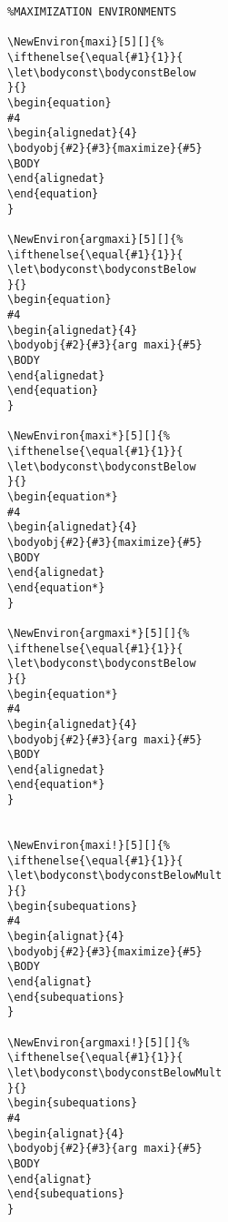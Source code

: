 \documentclass[]{report}
\begin{document}
\begin{verbatim}
%MAXIMIZATION ENVIRONMENTS

\NewEnviron{maxi}[5][]{%
\ifthenelse{\equal{#1}{1}}{
\let\bodyconst\bodyconstBelow
}{}
\begin{equation}
#4
\begin{alignedat}{4}
\bodyobj{#2}{#3}{maximize}{#5}
\BODY
\end{alignedat}
\end{equation}
}

\NewEnviron{argmaxi}[5][]{%
\ifthenelse{\equal{#1}{1}}{
\let\bodyconst\bodyconstBelow
}{}
\begin{equation}
#4
\begin{alignedat}{4}
\bodyobj{#2}{#3}{arg maxi}{#5}
\BODY
\end{alignedat}
\end{equation}
}

\NewEnviron{maxi*}[5][]{%
\ifthenelse{\equal{#1}{1}}{
\let\bodyconst\bodyconstBelow
}{}
\begin{equation*}
#4
\begin{alignedat}{4}
\bodyobj{#2}{#3}{maximize}{#5}
\BODY
\end{alignedat}
\end{equation*}
}

\NewEnviron{argmaxi*}[5][]{%
\ifthenelse{\equal{#1}{1}}{
\let\bodyconst\bodyconstBelow
}{}
\begin{equation*}
#4
\begin{alignedat}{4}
\bodyobj{#2}{#3}{arg maxi}{#5}
\BODY
\end{alignedat}
\end{equation*}
}


\NewEnviron{maxi!}[5][]{%
\ifthenelse{\equal{#1}{1}}{
\let\bodyconst\bodyconstBelowMult
}{}
\begin{subequations}
#4
\begin{alignat}{4}
\bodyobj{#2}{#3}{maximize}{#5}		
\BODY
\end{alignat}
\end{subequations}			
}

\NewEnviron{argmaxi!}[5][]{%
\ifthenelse{\equal{#1}{1}}{
\let\bodyconst\bodyconstBelowMult
}{}
\begin{subequations}
#4
\begin{alignat}{4}
\bodyobj{#2}{#3}{arg maxi}{#5}		
\BODY
\end{alignat}
\end{subequations}			
}
\end{verbatim}
\end{document}
